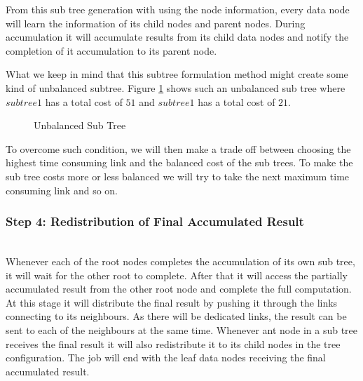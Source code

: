 \documentclass[10pt,conference,letterpaper]{IEEEtran}
\begin{document}
From this sub tree generation with using the node information, every data node will learn the information of its child nodes and parent nodes. During accumulation it will accumulate results from its child data nodes and notify the completion of it accumulation to its parent node.  

What we keep in mind that this  subtree formulation method might create some kind of unbalanced subtree. Figure \ref{uMST} shows such an unbalanced sub tree where $subtree1$ has a total cost of $51$ and $subtree1$ has a total cost of $21$.



\begin{figure}[!htbp]
\label{uMST}
\centering
{}
\caption{Unbalanced Sub Tree}
\end{figure}

To overcome such condition, we will then make a trade off between choosing the highest time consuming link and the balanced cost of the sub trees. To make the sub tree costs more or less balanced we will try to take the next maximum time consuming link and so on. 
\subsubsection{\textbf{Step 4: Redistribution of Final Accumulated Result}}\hspace*{\fill} \\
Whenever each of the root nodes completes the accumulation of its own sub tree, it will wait for the other root to complete. After that it will access the partially accumulated result from the other root node and complete the full computation. At this stage it will distribute the final result by pushing it through the links connecting to its neighbours. As there will be dedicated links, the result can be sent to each of the neighbours at the same time. Whenever ant node in a sub tree receives the final result it will also redistribute it to its child nodes in the tree configuration. The job will end with the leaf data nodes receiving the final accumulated result.
\end{document}
